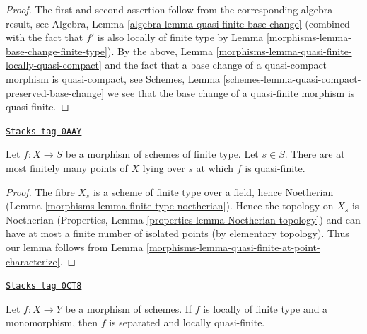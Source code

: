 \begin{proof}

The first and second assertion follow from the corresponding
algebra result, see
Algebra, Lemma \ref{algebra-lemma-quasi-finite-base-change}
(combined with the fact that $f'$ is also locally of finite type by
Lemma \ref{morphisms-lemma-base-change-finite-type}).
By the above, Lemma \ref{morphisms-lemma-quasi-finite-locally-quasi-compact}
and the fact that a base change of a
quasi-compact morphism is quasi-compact, see
Schemes, Lemma \ref{schemes-lemma-quasi-compact-preserved-base-change}
we see that the base change of a quasi-finite morphism
is quasi-finite.
\end{proof}

\begin{lemma}
\label{morphisms-lemma-quasi-finite-at-a-finite-number-of-points}
\href{https://stacks.math.columbia.edu/tag/0AAY}{\texttt{Stacks tag 0AAY}}

Let $f : X \to S$ be a morphism of schemes of finite type.
Let $s \in S$. There are at most finitely many points
of $X$ lying over $s$ at which $f$ is quasi-finite.
\end{lemma}

\begin{proof}

The fibre $X_s$ is a scheme of finite type over a field,
hence Noetherian (Lemma \ref{morphisms-lemma-finite-type-noetherian}).
Hence the topology on $X_s$ is Noetherian (Properties, Lemma
\ref{properties-lemma-Noetherian-topology})
and can have at most a finite number of isolated points (by elementary
topology). Thus our lemma follows from
Lemma \ref{morphisms-lemma-quasi-finite-at-point-characterize}.
\end{proof}

\begin{lemma}
\label{morphisms-lemma-monomorphism-loc-finite-type-loc-quasi-finite}
\href{https://stacks.math.columbia.edu/tag/0CT8}{\texttt{Stacks tag 0CT8}}

Let $f : X \to Y$ be a morphism of schemes.
If $f$ is locally of finite type and a monomorphism, then $f$
is separated and locally quasi-finite.
\end{lemma}

